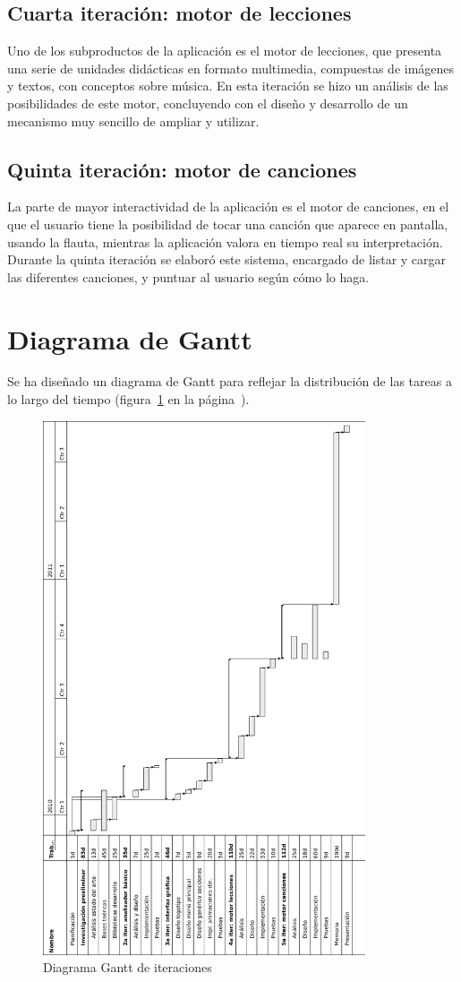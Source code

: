 \subsection{Cuarta iteración: motor de lecciones}
Uno de los subproductos de la aplicación es el motor de lecciones, que
presenta una serie de unidades didácticas en formato multimedia,
compuestas de imágenes y textos, con conceptos sobre música. En esta
iteración se hizo un análisis de las posibilidades de este motor,
concluyendo con el diseño y desarrollo de un mecanismo muy sencillo de
ampliar y utilizar.

\subsection{Quinta iteración: motor de canciones}
La parte de mayor interactividad de la aplicación es el motor de
canciones, en el que el usuario tiene la posibilidad de tocar una
canción que aparece en pantalla, usando la flauta, mientras la
aplicación valora en tiempo real su interpretación. Durante la quinta
iteración se elaboró este sistema, encargado de listar y cargar las
diferentes canciones, y puntuar al usuario según cómo lo haga.

\section{Diagrama de Gantt}
Se ha diseñado un diagrama de Gantt para reflejar la distribución de las tareas
a lo largo del tiempo (figura~\ref{fig:gantt} en la página~\pageref{fig:gantt}).

\begin{figure}
  \centering
  \includegraphics[width=0.85\textwidth]{2_calendario/diagrama_gantt}
  \caption{Diagrama Gantt de iteraciones}
  \label{fig:gantt}
\end{figure}


